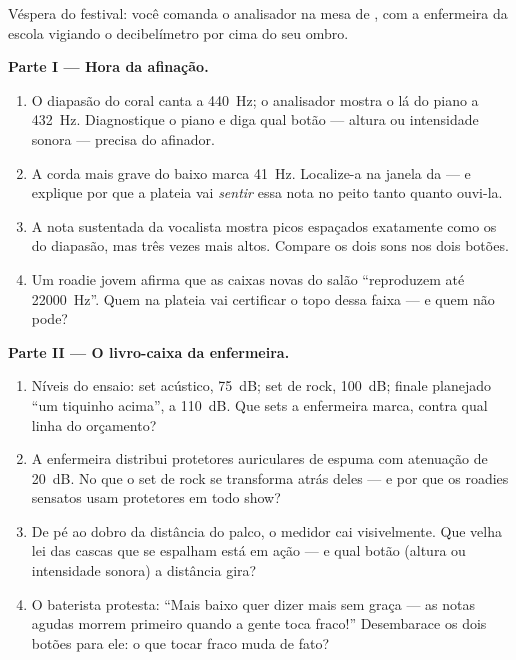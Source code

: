 \begin{problem}\label{pb:g8:sound-pitch-loudness:1}
Véspera do festival: você comanda o analisador na mesa de , com a
enfermeira da escola vigiando o decibelímetro por cima do seu ombro.

\medskip\noindent\textbf{Parte I --- Hora da afinação.}
\begin{enumerate}
  \item O diapasão do coral canta a \qty{440}{Hz}; o analisador
        mostra o lá do piano a \qty{432}{Hz}. Diagnostique o piano e
        diga qual botão --- altura ou intensidade sonora --- precisa
        do afinador.
  \item A corda mais grave do baixo marca \qty{41}{Hz}. Localize-a na
        janela da  --- e explique por que a plateia vai
        \emph{sentir} essa nota no peito tanto quanto ouvi-la.
  \item A nota sustentada da vocalista mostra picos espaçados
        exatamente como os do diapasão, mas três vezes mais altos.
        Compare os dois sons nos dois botões.
  \item Um roadie jovem afirma que as caixas novas do salão
        ``reproduzem até \qty{22000}{Hz}''. Quem na plateia vai
        certificar o topo dessa faixa --- e quem não pode?
\end{enumerate}

\medskip\noindent\textbf{Parte II --- O livro-caixa da enfermeira.}
\begin{enumerate}[resume]
  \item Níveis do ensaio: set acústico, \qty{75}{dB}; set de rock,
        \qty{100}{dB}; finale planejado ``um tiquinho acima'', a
        \qty{110}{dB}. Que sets a enfermeira marca, contra qual linha
        do orçamento?
  \item A enfermeira distribui protetores auriculares de espuma com
        atenuação de \qty{20}{dB}. No que o set de rock se transforma
        atrás deles --- e por que os roadies sensatos usam protetores
        em todo show?
  \item De pé ao dobro da distância do palco, o medidor cai
        visivelmente. Que velha lei das cascas que se espalham está
        em ação --- e qual botão (altura ou intensidade sonora) a
        distância gira?
  \item O baterista protesta: ``Mais baixo quer dizer mais sem
        graça --- as notas agudas morrem primeiro quando a gente toca
        fraco!'' Desembarace os dois botões para ele: o que tocar
        fraco muda de fato?
\end{enumerate}


\end{problem}
